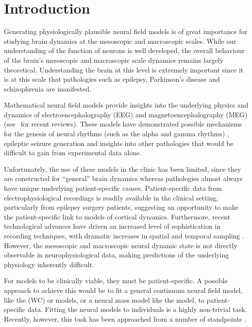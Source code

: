 \documentclass[review,authoryear,3p]{elsarticle}
\begin{document}
\section{Introduction}

Generating physiologically plausible neural field models is of great importance for studying brain dynamics at the mesoscopic and macroscopic scales. While our understanding of the function of neurons is well developed, the overall behaviour of the brain's mesoscopic and macroscopic scale dynamics remains largely theoretical. Understanding the brain at this level is extremely important since it is at this scale that pathologies such as epilepsy, Parkinson's disease and schizophrenia are manifested. 

Mathematical neural field models provide insights into the underlying physics and dynamics of electroencephalography (EEG) and magnetoencephalography (MEG) (see~\citet{Deco2008,David2003} for recent reviews). These models have demonstrated possible mechanisms for the genesis of neural rhythms (such as the alpha and gamma rhythms) \citep{Liley1999,RENNIE2000}, epileptic seizure generation \citep{DaSilva2003,Suffczynski2004,Wendling2005} and insights into other pathologies \citep{Moran2008,Schiff2009} that would be difficult to gain from experimental data alone. 

Unfortunately, the use of these models in the clinic has been limited, since they are constructed for ``general'' brain dynamics whereas pathologies almost always have unique underlying patient-specific causes. Patient-specific data from electrophysiological recordings is readily available in the clinical setting, particularly from epilepsy surgery patients, suggesting an opportunity to make the patient-specific link to models of cortical dynamics. Furthermore, recent technological advances have driven an increased level of sophistication in recording techniques, with dramatic increases in spatial and temporal sampling \citep{Brinkmann2009}. However, the mesoscopic and macroscopic neural dynamic state is not directly observable in neurophysiological data, making predictions of the underlying physiology inherently difficult.

For models to be clinically viable, they must be patient-specific. A possible approach to achieve this would be to fit a general continuum neural field model, like the \citet{Wilson1973} (WC) or \citet{Amari1977} models, or a neural mass model like the \citet{Jansen1995} model, to patient-specific data. Fitting the neural models to individuals is a highly non-trivial task. Recently, however, this task has been approached from a number of standpoints \citep{Nunez2000,Jirsa2002,Robinson2004,Daunizeau2009}.
\end{document}
